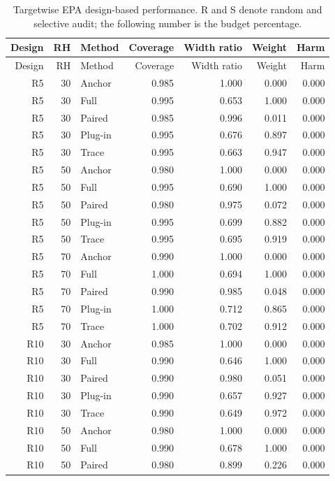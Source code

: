 \begingroup\setlength{\tabcolsep}{4pt}
\begin{longtable}{rrlrrrr}
\caption{Targetwise EPA design-based performance. R and S denote random and selective audit; the following number is the budget percentage.}\label{tab:allepa}\\
\toprule
Design & RH & Method & Coverage & Width ratio & Weight & Harm\\
\midrule
\endfirsthead
\toprule
Design & RH & Method & Coverage & Width ratio & Weight & Harm\\
\midrule
\endhead
\bottomrule\endfoot
R5 & 30 & Anchor & 0.985 & 1.000 & 0.000 & 0.000\\
R5 & 30 & Full & 0.995 & 0.653 & 1.000 & 0.000\\
R5 & 30 & Paired & 0.985 & 0.996 & 0.011 & 0.000\\
R5 & 30 & Plug-in & 0.995 & 0.676 & 0.897 & 0.000\\
R5 & 30 & Trace & 0.995 & 0.663 & 0.947 & 0.000\\
R5 & 50 & Anchor & 0.980 & 1.000 & 0.000 & 0.000\\
R5 & 50 & Full & 0.995 & 0.690 & 1.000 & 0.000\\
R5 & 50 & Paired & 0.980 & 0.975 & 0.072 & 0.000\\
R5 & 50 & Plug-in & 0.995 & 0.699 & 0.882 & 0.000\\
R5 & 50 & Trace & 0.995 & 0.695 & 0.919 & 0.000\\
R5 & 70 & Anchor & 0.990 & 1.000 & 0.000 & 0.000\\
R5 & 70 & Full & 1.000 & 0.694 & 1.000 & 0.000\\
R5 & 70 & Paired & 0.990 & 0.985 & 0.048 & 0.000\\
R5 & 70 & Plug-in & 1.000 & 0.712 & 0.865 & 0.000\\
R5 & 70 & Trace & 1.000 & 0.702 & 0.912 & 0.000\\
R10 & 30 & Anchor & 0.985 & 1.000 & 0.000 & 0.000\\
R10 & 30 & Full & 0.990 & 0.646 & 1.000 & 0.000\\
R10 & 30 & Paired & 0.990 & 0.980 & 0.051 & 0.000\\
R10 & 30 & Plug-in & 0.990 & 0.657 & 0.927 & 0.000\\
R10 & 30 & Trace & 0.990 & 0.649 & 0.972 & 0.000\\
R10 & 50 & Anchor & 0.980 & 1.000 & 0.000 & 0.000\\
R10 & 50 & Full & 0.990 & 0.678 & 1.000 & 0.000\\
R10 & 50 & Paired & 0.980 & 0.899 & 0.226 & 0.000\\

\end{longtable}
